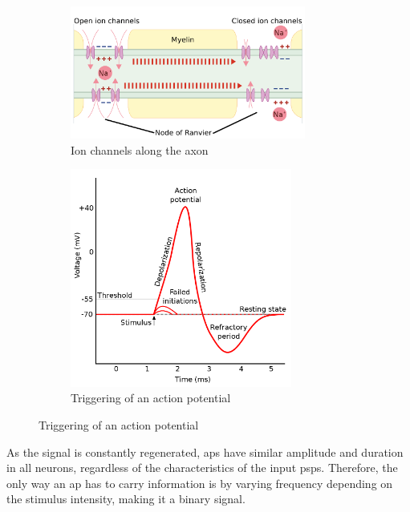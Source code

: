 \begin{description}
\begin{description}
                \begin{figure}[H]
                    \begin{subfigure}{.45\textwidth}
                        \centering
                        \includegraphics[width=0.85\textwidth]{./img/saltatory_conduction.png}
                        \caption{Ion channels along the axon}
                    \end{subfigure}
                    \begin{subfigure}{.45\textwidth}
                        \centering
                        \includegraphics[width=0.8\textwidth]{./img/action_potential.png}
                        \caption{Triggering of an action potential}
                    \end{subfigure}
                \end{figure}
        \end{description}


        \begin{remark}
            As the signal is constantly regenerated, 
            \Acp{ap} have similar amplitude and duration in all neurons, regardless of the characteristics of the input \acp{psp}.
            Therefore, the only way an \ac{ap} has to carry information is by varying frequency depending on the stimulus intensity, making it a binary signal.
        \end{remark}
\end{description}

